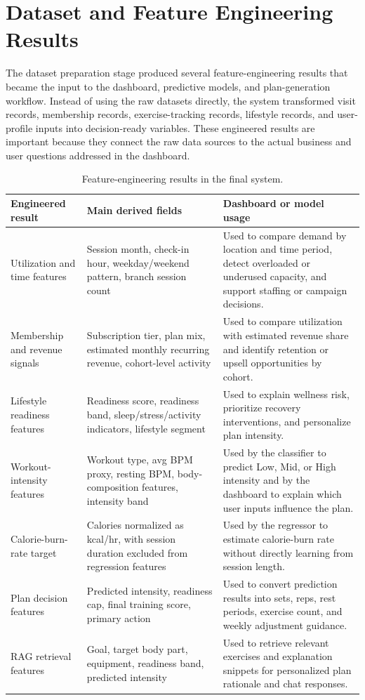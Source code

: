\documentclass{aitthesis}
\begin{document}
\section{Dataset and Feature Engineering Results}

The dataset preparation stage produced several feature-engineering results that became the input to the dashboard, predictive models, and plan-generation workflow. Instead of using the raw datasets directly, the system transformed visit records, membership records, exercise-tracking records, lifestyle records, and user-profile inputs into decision-ready variables. These engineered results are important because they connect the raw data sources to the actual business and user questions addressed in the dashboard.

\begin{table}[htbp]
\centering
\small
\caption{Feature-engineering results in the final system.}
\label{tab:feature_engineering_results}
\begin{tabularx}{\linewidth}{p{3.5cm}p{4.1cm}X}
\toprule
\textbf{Engineered result} & \textbf{Main derived fields} & \textbf{Dashboard or model usage} \\
\midrule
Utilization and time features & Session month, check-in hour, weekday/weekend pattern, branch session count & Used to compare demand by location and time period, detect overloaded or underused capacity, and support staffing or campaign decisions. \\
Membership and revenue signals & Subscription tier, plan mix, estimated monthly recurring revenue, cohort-level activity & Used to compare utilization with estimated revenue share and identify retention or upsell opportunities by cohort. \\
Lifestyle readiness features & Readiness score, readiness band, sleep/stress/activity indicators, lifestyle segment & Used to explain wellness risk, prioritize recovery interventions, and personalize plan intensity. \\
Workout-intensity features & Workout type, avg BPM proxy, resting BPM, body-composition features, intensity band & Used by the classifier to predict Low, Mid, or High intensity and by the dashboard to explain which user inputs influence the plan. \\
Calorie-burn-rate target & Calories normalized as kcal/hr, with session duration excluded from regression features & Used by the regressor to estimate calorie-burn rate without directly learning from session length. \\
Plan decision features & Predicted intensity, readiness cap, final training score, primary action & Used to convert prediction results into sets, reps, rest periods, exercise count, and weekly adjustment guidance. \\
RAG retrieval features & Goal, target body part, equipment, readiness band, predicted intensity & Used to retrieve relevant exercises and explanation snippets for personalized plan rationale and chat responses. \\
\bottomrule
\end{tabularx}
\end{table}
\end{document}
